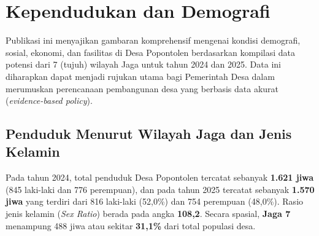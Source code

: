 
\section{Kependudukan dan Demografi}

Publikasi ini menyajikan gambaran komprehensif mengenai kondisi demografi, sosial, ekonomi, dan fasilitas di Desa Popontolen berdasarkan kompilasi data potensi dari 7 (tujuh) wilayah Jaga untuk tahun 2024 dan 2025. Data ini diharapkan dapat menjadi rujukan utama bagi Pemerintah Desa dalam merumuskan perencanaan pembangunan desa yang berbasis data akurat (\textit{evidence-based policy}).

\subsection{Penduduk Menurut Wilayah Jaga dan Jenis Kelamin}

Pada tahun 2024, total penduduk Desa Popontolen tercatat sebanyak \textbf{1.621 jiwa} (845 laki-laki dan 776 perempuan), dan pada tahun 2025 tercatat sebanyak \textbf{1.570 jiwa} yang terdiri dari 816 laki-laki (52,0\%) dan 754 perempuan (48,0\%). Rasio jenis kelamin (\textit{Sex Ratio}) berada pada angka \textbf{108,2}. Secara spasial, \textbf{Jaga 7} menampung 488 jiwa atau sekitar \textbf{31,1\%} dari total populasi desa.

\vspace{0.3cm}

